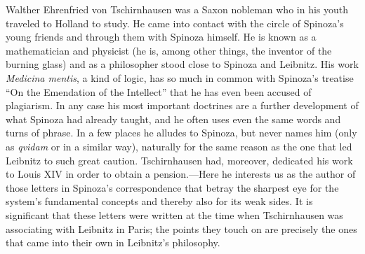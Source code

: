 \documentclass[12pt]{book}
\newcommand{\opage}[1]{\marginnote{\footnotesize\textit{[#1]}}}
\begin{document}
Walther Ehrenfried von Tschirnhausen was a Saxon nobleman who in his youth traveled to
Holland to study. He came into contact with the circle of Spinoza's young friends and
through them with Spinoza himself. He is known as a mathematician and physicist (he is,
among other things, the inventor of the burning glass) and as a philosopher stood close
to Spinoza and Leibnitz. His work \textit{Medicina mentis}, a kind of logic, has so
much in common with Spinoza's treatise ``On the Emendation of the Intellect'' that he
has even been accused of plagiarism. In any case his most important doctrines are a
further development of what Spinoza had already taught, and he often uses even the
same words and turns of phrase. In a few places he alludes to Spinoza, but never names
him (only as \textit{qvidam} or in a similar way), naturally for the same reason as
\opage{68}the one that led Leibnitz to such great caution. Tschirnhausen had,
moreover, dedicated his work to Louis XIV in order to obtain a pension.---Here he
interests us as the author of those letters in Spinoza's correspondence that betray the
sharpest eye for the system's fundamental concepts and thereby also for its weak sides.
It is significant that these letters were written at the time when Tschirnhausen was
associating with Leibnitz in Paris; the points they touch on are precisely the ones
that came into their own in Leibnitz's philosophy.
\end{document}
